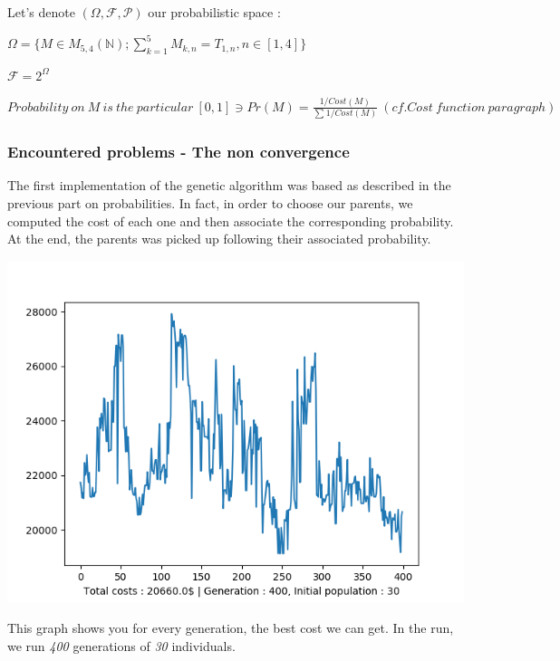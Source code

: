 \documentclass[11pt]{article}
\begin{document}
Let's denote \((\Omega, \mathcal{F}, \mathcal{P})\) our probabilistic
space :

\begin{center}
\(\Omega=\{M\in M_{5,4}(\mathbb{N}) ; \sum_{k=1}^{5}M_{k,n}=T_{1,n} , n\in[1,4]\}\)

\(\mathcal{F}=2^\Omega\)

\(Probability\ on\ M\ is\ the\ particular\ [0,1] \ni Pr(M) = 
\frac{1/Cost(M)}{\sum_{}1/Cost(M)} \ (cf. Cost\ function\ paragraph)\)
\end{center}

\pagebreak

    \hypertarget{encountered-problems---the-non-convergence}{%
\subsubsection{Encountered problems - The non
convergence}\label{encountered-problems---the-non-convergence}}

The first implementation of the genetic algorithm was based as described
in the previous part on probabilities. In fact, in order to choose our
parents, we computed the cost of each one and then associate the
corresponding probability. At the end, the parents was picked up
following their associated probability.

\begin{center}
\includegraphics{image_genetic_airplane_1}
\end{center}

This graph shows you for every generation, the best cost we can get. In
the run, we run \emph{400} generations of \emph{30} individuals.
\end{document}
